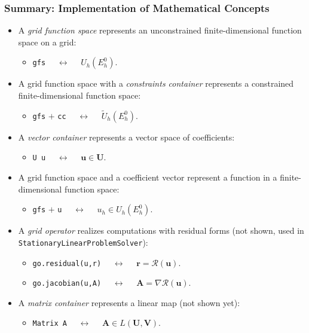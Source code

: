 \begin{frame}
\frametitle{Summary: Implementation of Mathematical Concepts}
\begin{itemize}
\item A \textit{grid function space} represents an unconstrained finite-dimensional
function space on a grid:
\begin{itemize}
\item \lstinline{gfs} $\quad\leftrightarrow\quad$ $U_h(E_h^0)$.
\end{itemize}
\item A grid function space with a \textit{constraints container} represents a constrained
finite-dimensional function space:
\begin{itemize}
\item \lstinline{gfs} $+$ \lstinline{cc} $\quad\leftrightarrow\quad$ $\tilde{U}_h(E_h^0)$.
\end{itemize}
\item A \textit{vector container} represents a vector space of coefficients:
\begin{itemize}
\item \lstinline{U u} $\quad\leftrightarrow\quad$ $\mathbf{u}\in\mathbf{U}$.
\end{itemize}
\item A grid function space and a coefficient vector represent a function in a
finite-dimensional function space:
\begin{itemize}
\item \lstinline{gfs} $+$ \lstinline{u} $\quad\leftrightarrow\quad$ $u_h\in U_h(E_h^0)$.
\end{itemize}
\item A \textit{grid operator} realizes computations with residual forms (not shown,
used in \lstinline{StationaryLinearProblemSolver}):
\begin{itemize}
\item \lstinline{go.residual(u,r)} $\quad\leftrightarrow\quad$ $\mathbf{r} = \mathcal{R}(\mathbf{u})$.
\item \lstinline{go.jacobian(u,A)} $\quad\leftrightarrow\quad$ $\mathbf{A} = \nabla\mathcal{R}(\mathbf{u})$.
\end{itemize}
\item A \textit{matrix container} represents a linear map (not shown yet):
\begin{itemize}
\item \lstinline{Matrix A} $\quad\leftrightarrow\quad$ $\mathbf{A}\in L(\mathbf{U},\mathbf{V})$.
\end{itemize}
\end{itemize}
\end{frame}

